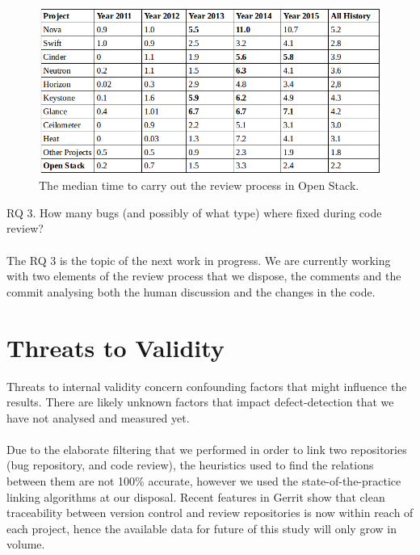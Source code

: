 \documentclass[ifip]{svmult}
\begin{document}
\begin{figure}[H]
\centering

\includegraphics[width=1.0\textwidth,natwidth=781,natheight=381]{gerrit.png}

\caption{The median time to carry out the review process in Open Stack.}
\label{fig:5}       %
\end{figure}

RQ 3. How many bugs (and possibly of what type) where fixed during code review?
\\
\\
The RQ 3 is the topic of the next work in progress.
We are currently working with two elements of the review process that we dispose, the comments and the commit 
analysing both the human discussion and the changes in the code. 

\section{Threats to Validity}
\label{sec:6}

Threats to internal validity concern confounding factors that might influence the results. There
are likely unknown factors that impact defect-detection that we have not analysed and measured yet.
\\
\\
Due to the elaborate filtering that we performed in order to link two repositories (bug repository, 
and code review), the  heuristics  used  to  find  the
relations  between  them  are  not  100\%  accurate,
however  we  used  the  state-of-the-practice  linking  algorithms
at  our  disposal.  Recent  features  in  Gerrit  show  that  clean
traceability  between  version  control  and  review  repositories
is now within reach of each project, hence the available data
for future of this study will only grow in volume.
\end{document}
